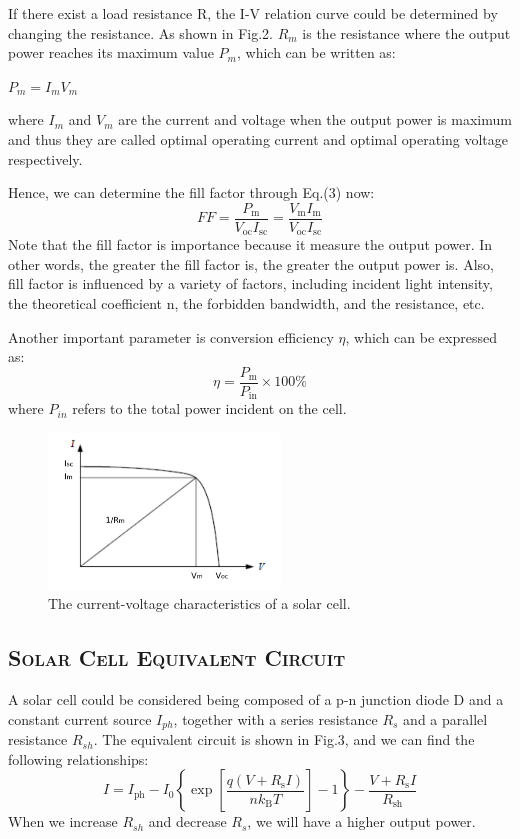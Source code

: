 \documentclass[a4paper,12pt]{article}
\begin{document}
If there exist a load resistance R, the I-V relation curve could be determined by changing the resistance. As shown in Fig.2. $R_m$ is the resistance where the output power reaches its maximum value $P_m$, which can be written as:
\begin{center}
$P_m = I_m V_m$
\end{center}
where $I_m$ and $V_m$ are the current and voltage when the output power is maximum and thus they are called optimal operating current and optimal operating voltage respectively.
\par Hence, we can determine the fill factor through Eq.(3) now:
\begin{equation}
F F=\frac{P_{\mathrm{m}}}{V_{\mathrm{oc}} I_{\mathrm{sc}}}=\frac{V_{\mathrm{m}} I_{\mathrm{m}}}{V_{\mathrm{oc}} I_{\mathrm{sc}}}
\end{equation}
Note that the fill factor is importance because it measure the output power. In other words, the greater the fill factor is, the greater the output power is. Also, fill factor is influenced by a variety of factors, including incident light intensity, the theoretical coefficient n, the forbidden bandwidth, and the resistance, etc.
\par Another important parameter is conversion efficiency $\eta$, which can be expressed as:
\begin{equation}
\eta=\frac{P_{\mathrm{m}}}{P_{\mathrm{in}}} \times 100 \%
\end{equation}
where $P_{in}$ refers to the total power incident on the cell.

\begin{figure}[htb] 
    \centering
    \includegraphics[width=0.55\textwidth]{Fig2} 
    \caption{The current-voltage characteristics of a solar cell.\cite{labmanual}} 
\end{figure}

\subsection{\textsc{Solar Cell Equivalent Circuit}}
A solar cell could be considered being composed of a p-n junction diode D and a constant current source $I_{ph}$, together with a series resistance $R_s$ and a parallel resistance $R_{sh}$. The equivalent circuit is shown in Fig.3, and we can find the following relationships:
\begin{equation}
I=I_{\mathrm{ph}}-I_{0}\left\{\exp \left[\frac{q\left(V+R_{\mathrm{s}} I\right)}{n k_{\mathrm{B}} T}\right]-1\right\}-\frac{V+R_{\mathrm{s}} I}{R_{\mathrm{sh}}}
\end{equation}
When we increase $R_{sh}$ and decrease $R_s$, we will have a higher output power.
\end{document}
